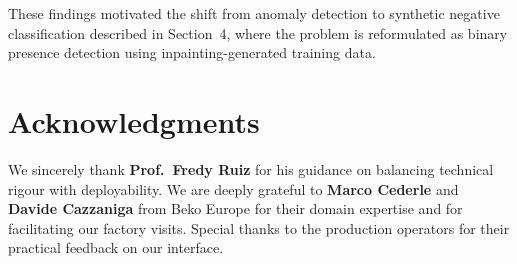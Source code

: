 \documentclass[11pt,a4paper]{article}
\begin{document}
These findings motivated the shift from anomaly detection to synthetic negative classification described in Section~4, where the problem is reformulated as binary presence detection using inpainting-generated training data.

\section{Acknowledgments}

We sincerely thank \textbf{Prof.\ Fredy Ruiz} for his guidance on balancing technical rigour with deployability. We are deeply grateful to \textbf{Marco Cederle} and \textbf{Davide Cazzaniga} from Beko Europe for their domain expertise and for facilitating our factory visits. Special thanks to the production operators for their practical feedback on our interface.
\end{document}
